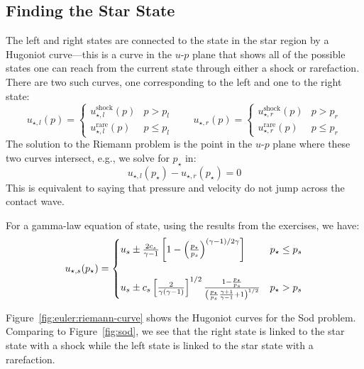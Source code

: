 \subsection{Finding the Star State}

The left and right states are connected to the state in the star
region by a Hugoniot curve---this is a curve in the $u$-$p$ plane that
shows all of the possible states one can reach from the current state
through either a shock or rarefaction.  There are two such curves, one
corresponding to the left and one to the right state:
\begin{equation}
u_{\star,l}(p) = \begin{cases}
   u_{\star,l}^\mathrm{shock}(p) & p > p_l \\
   u_{\star,l}^\mathrm{rare}(p) & p \le p_l 
   \end{cases}
\qquad
u_{\star,r}(p) = \begin{cases}
   u_{\star,r}^\mathrm{shock}(p) & p > p_r \\
   u_{\star,r}^\mathrm{rare}(p) & p \le p_r 
   \end{cases}
\end{equation}
The solution
to the Riemann problem is the point in the $u$-$p$ plane where these
two curves intersect, e.g., we solve for $p_\star$ in:
\begin{equation}
u_{\star,l}(p_\star) - u_{\star,r}(p_\star) = 0
\end{equation}
This is equivalent to saying that pressure and velocity do not jump
across the contact wave.

For a gamma-law equation of state, using the results from the
exercises, we have:
\begin{equation}
\renewcommand{\arraystretch}{1.5}
u_{\star,s}(p_\star) = \begin{cases}
  u_s \pm \frac{2c_s}{\gamma - 1} \left [ 1 - \left ( \frac{p_\star}{p_s}\right )^{(\gamma - 1)/2\gamma} \right ] & p_\star \le p_s \\
\\
%
  u_s \pm c_s \left [\frac{2}{\gamma(\gamma - 1)}\right]^{1/2} \frac{1 - \frac{p_\star}{p_s}}{\left ( \frac{p_\star}{p_s} \frac{\gamma + 1}{\gamma - 1} + 1\right)^{1/2}} & p_\star > p_s
\end{cases}
\renewcommand{\arraystretch}{1.0}
\end{equation}



Figure~\ref{fig:euler:riemann-curve} shows the Hugoniot curves for the
Sod problem.  Comparing to Figure~\ref{fig:sod}, we see that the right
state is linked to the star state with a shock while the left state is
linked to the star state with a rarefaction.

